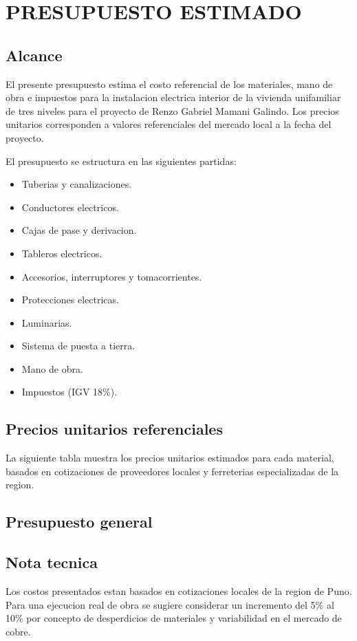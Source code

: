\chapter{PRESUPUESTO ESTIMADO}

\section{Alcance}

El presente presupuesto estima el costo referencial de los materiales, mano de obra e impuestos para la instalacion electrica interior de la vivienda unifamiliar de tres niveles para el proyecto de Renzo Gabriel Mamani Galindo. Los precios unitarios corresponden a valores referenciales del mercado local a la fecha del proyecto.

El presupuesto se estructura en las siguientes partidas:
\begin{itemize}
  \item Tuberias y canalizaciones.
  \item Conductores electricos.
  \item Cajas de pase y derivacion.
  \item Tableros electricos.
  \item Accesorios, interruptores y tomacorrientes.
  \item Protecciones electricas.
  \item Luminarias.
  \item Sistema de puesta a tierra.
  \item Mano de obra.
  \item Impuestos (IGV 18\%).
\end{itemize}

\section{Precios unitarios referenciales}

La siguiente tabla muestra los precios unitarios estimados para cada material, basados en cotizaciones de proveedores locales y ferreterias especializadas de la region.



\clearpage

\section{Presupuesto general}



\section{Nota tecnica}

Los costos presentados estan basados en cotizaciones locales de la region de Puno. Para una ejecucion real de obra se sugiere considerar un incremento del 5\% al 10\% por concepto de desperdicios de materiales y variabilidad en el mercado de cobre.
